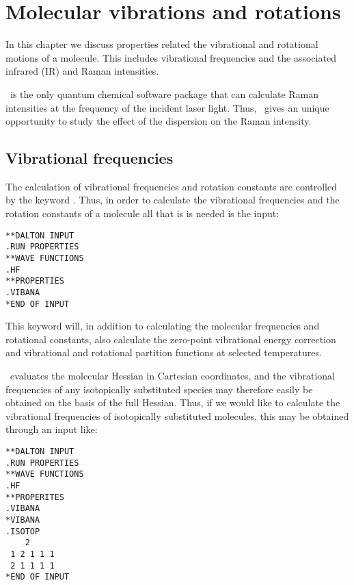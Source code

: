 \chapter{Molecular vibrations and rotations}\label{ch:vibrot}

In this chapter we discuss properties related the
vibrational and rotational motions of a molecule. This includes
vibrational frequencies and the associated infrared (IR) and Raman  intensities.

\siraba\ is the only quantum chemical software package that can calculate
 Raman intensities at the frequency of the incident laser light. Thus,
\siraba\ gives an unique opportunity to study the effect of the
dispersion on the Raman intensity.

\section{Vibrational frequencies}\label{sec:vibfreq}

The calculation of vibrational frequencies and rotation constants are
controlled by the keyword . Thus, in order to
calculate the vibrational frequencies and the rotation constants
of a molecule all that is is needed is the input:

\begin{verbatim}
**DALTON INPUT
.RUN PROPERTIES
**WAVE FUNCTIONS
.HF
**PROPERTIES
.VIBANA
*END OF INPUT
\end{verbatim}

This keyword will, in addition to calculating the molecular frequencies
and rotational constants, also calculate the zero-point vibrational
energy correction and vibrational
and rotational partition functions
at selected temperatures.

\siraba\ evaluates the molecular Hessian in Cartesian
coordinates, and
the vibrational frequencies of any isotopically substituted  species
may therefore easily be obtained on the basis of the full
Hessian. Thus, if we would like to calculate the vibrational
frequencies of isotopically substituted molecules, this may be obtained through an input like:

\begin{verbatim}
**DALTON INPUT
.RUN PROPERTIES
**WAVE FUNCTIONS
.HF
**PROPERITES
.VIBANA
*VIBANA
.ISOTOP
    2
 1 2 1 1 1
 2 1 1 1 1
*END OF INPUT
\end{verbatim}

